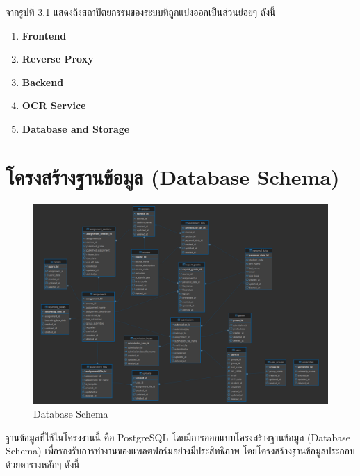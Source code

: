   จากรูปที่ 3.1 แสดงถึงสถาปัตยกรรมของระบบที่ถูกแบ่งออกเป็นส่วนย่อยๆ ดังนี้
  \begin{enumerate}
    \item \textbf{Frontend} 
    \item \textbf{Reverse Proxy} 
    \item \textbf{Backend} 
    \item \textbf{OCR Service} 
    \item \textbf{Database and Storage} 
  \end{enumerate}

\section{โครงสร้างฐานข้อมูล (Database Schema)}
  \begin{figure}[!ht]
    \centering
    \includegraphics[width=1\textwidth]{image/Approach/Database-Schema.png}
    \caption[Database Schema]{Database Schema}
    \label{fig:database_schema}
  \end{figure}
  \FloatBarrier
  \qquad ฐานข้อมูลที่ใช้ในโครงงานนี้ คือ PostgreSQL โดยมีการออกแบบโครงสร้างฐานข้อมูล (Database Schema) เพื่อรองรับการทำงานของแพลตฟอร์มอย่างมีประสิทธิภาพ
  โดยโครงสร้างฐานข้อมูลประกอบด้วยตารางหลักๆ ดังนี้

